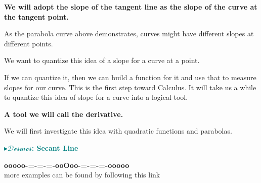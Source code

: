 \documentclass{ximera}
\begin{document}
\begin{center}
\textbf{\textcolor{blue!55!black}{We will adopt the slope of the tangent line as the slope of the curve at the tangent point. }}  
\end{center}

As the parabola curve above demonstrates, curves might have different slopes at different points. 

We want to quantize this idea of a slope for a curve at a point. 

If we can quantize it, then we can build a function for it and use that to measure slopes for our curve. This is the first step toward Calculus. It will take us a while to quantize this idea of slope for a curve into a logical tool. 



\begin{center}
\textbf{\textcolor{blue!55!black}{A tool we will call the \textbf{derivative}.}}  
\end{center}



We will first investigate this idea with quadratic functions and parabolas. 








\begin{onlineOnly}
\textbf{\textcolor{teal}{$\blacktriangleright \mathcal{Desmos}$: Secant Line}} 
\begin{center}
\end{center}
\end{onlineOnly}

















\begin{center}
\textbf{\textcolor{green!50!black}{ooooo-=-=-=-ooOoo-=-=-=-ooooo}} \\

more examples can be found by following this link\\ 

\end{center}
\end{document}
